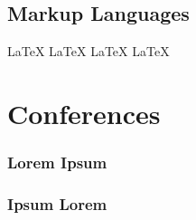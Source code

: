 \documentclass[]{deedy-resume-openfont}
\begin{document}
\begin{minipage}[t]{0.34\textwidth}
    \subsection{Markup Languages}
    \justifying \noindent \LaTeX \textbullet{} \LaTeX \textbullet{} \LaTeX \textbullet{} \LaTeX


    \section{Conferences}

    \noindent\subsubsection{{Lorem Ipsum}}
    \sectionsep

    \noindent\subsubsection{{Ipsum Lorem}}

\end{minipage}
\hfill
\end{document}

